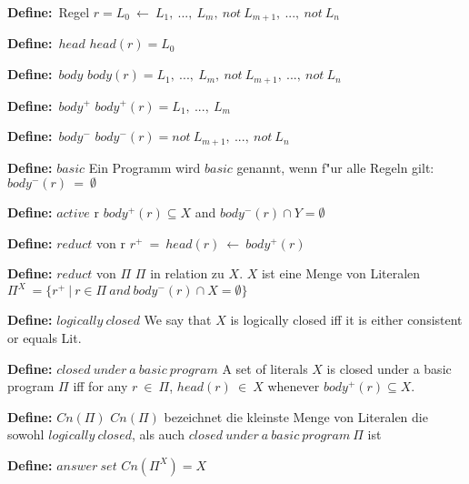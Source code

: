 {\textbf{Define:}~Regel}
  $r = L_0~\leftarrow~L_1,~...,~L_m,~not~L_{m+1},~...,~not~L_n$

{\textbf{Define:}~$head$}
  $head(r) = L_0$

{\textbf{Define:}~$body$}
  $body(r) = {L_1,~...,~L_m,~not~L_{m+1},~...,~not~L_n}$



{\textbf{Define:}~$body^+$}
  $body^+(r) = {L_1,~...,~L_m}$

{\textbf{Define:}~$body^-$}
  $body^-(r) = {not~L_{m+1},~...,~not~L_n}$

{\textbf{Define:} $basic$}
  Ein Programm wird $basic$ genannt, wenn f"ur alle Regeln gilt:\\
  $body^-(r)~=~\emptyset$



{\textbf{Define:} $active$ r}
  $body^+(r) \subseteq X$ and $body^-(r) \cap Y = \emptyset$

{\textbf{Define:} $reduct$ von r}
  $r^+~=~head(r)~\leftarrow~body^+(r)$

{\textbf{Define:} $reduct$ von $\Pi$}
  $\Pi$ in relation zu $X$. $X$ ist eine Menge von Literalen\\
  $\Pi^X~=\{r^+~|~r \in \Pi~and~body^-(r) \cap X = \emptyset \}$



{\textbf{Define:} $logically~closed$}
  We say that $X$ is logically closed iff it is either consistent or equals Lit.

{\textbf{Define:} $closed~under~a~basic~program$}
  A set of literals $X$ is closed under a basic program $\Pi$ iff for
  any $r~\in~\Pi$, $head(r)~\in~X$ whenever $body^+(r) \subseteq X$.



{\textbf{Define:} $Cn(\Pi)$}
  $Cn(\Pi)$ bezeichnet die kleinste Menge von Literalen die sowohl
  $logically~closed$, als auch $closed~under~a~basic~program~\Pi$ ist

{\textbf{Define:} $answer~set$}
  $Cn(\Pi^X)=X$




